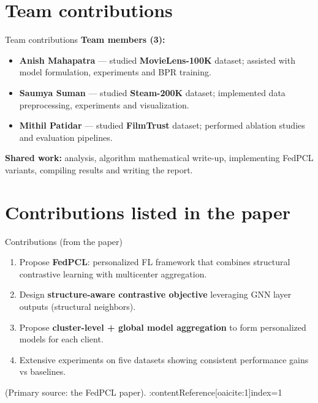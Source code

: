 \documentclass{beamer}
\begin{document}
\section{Team contributions}
\begin{frame}{Team contributions}
  \textbf{Team members (3):}
  \begin{itemize}
    \item \textbf{Anish Mahapatra} — studied \textbf{MovieLens-100K} dataset; assisted with model formulation, experiments and BPR training.
    \item \textbf{Saumya Suman} — studied \textbf{Steam-200K} dataset; implemented data preprocessing, experiments and visualization.
    \item \textbf{Mithil Patidar} — studied \textbf{FilmTrust} dataset; performed ablation studies and evaluation pipelines.
  \end{itemize}
  \vspace{4pt}
  \textbf{Shared work:} analysis, algorithm mathematical write-up, implementing FedPCL variants, compiling results and writing the report.
\end{frame}

\section{Contributions listed in the paper}
\begin{frame}{Contributions (from the paper)}
  \begin{enumerate}
    \item Propose \textbf{FedPCL}: personalized FL framework that combines structural contrastive learning with multicenter aggregation.
    \item Design \textbf{structure-aware contrastive objective} leveraging GNN layer outputs (structural neighbors).
    \item Propose \textbf{cluster-level + global model aggregation} to form personalized models for each client.
    \item Extensive experiments on five datasets showing consistent performance gains vs baselines.
  \end{enumerate}
  (Primary source: the FedPCL paper). :contentReference[oaicite:1]{index=1}
\end{frame}

\end{document}
